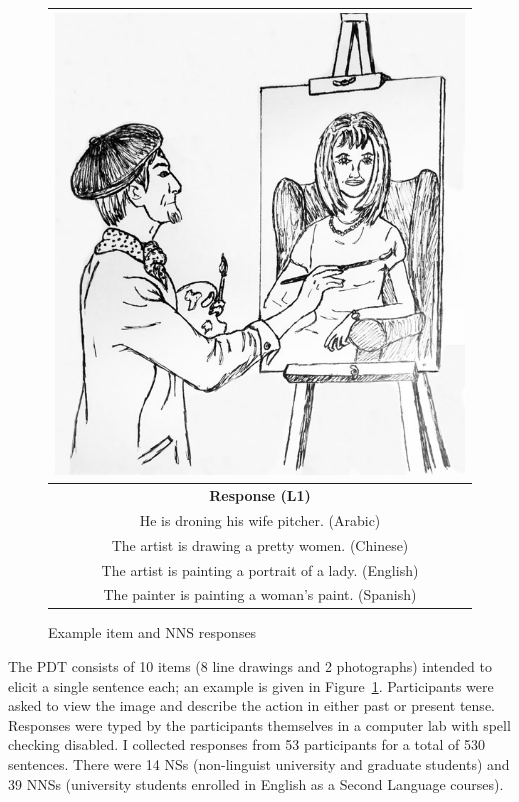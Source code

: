 \begin{figure}[htb!]
\begin{center}
\begin{tabular}{|c|}
\hline
\includegraphics[width=0.8\columnwidth]{figures/exampleprompt.jpg}\\
\hline
\textbf{Response (L1)} \\
\hline
He is droning his wife pitcher. (Arabic)\\
\hline
The artist is drawing a pretty women. (Chinese) \\
\hline
The artist is painting a portrait of a lady. (English) \\
\hline
The painter is painting a woman's paint. (Spanish)\\
\hline
\end{tabular}
\end{center}
\caption{Example item and NNS responses}
\label{fig:example-picture}
\end{figure}

The PDT consists of 10 items (8 line drawings and 2 photographs) intended to elicit a single sentence each; an example is given in Figure~\ref{fig:example-picture}. Participants
were asked to view the image and describe the action in either past or present tense. Responses were typed by the participants themselves in a computer lab with spell checking disabled.
I collected responses from 53 participants for a total of 530 sentences. There were 14 NSs (non-linguist university and graduate students) and 39 NNSs (university students enrolled in English as a Second Language courses).
